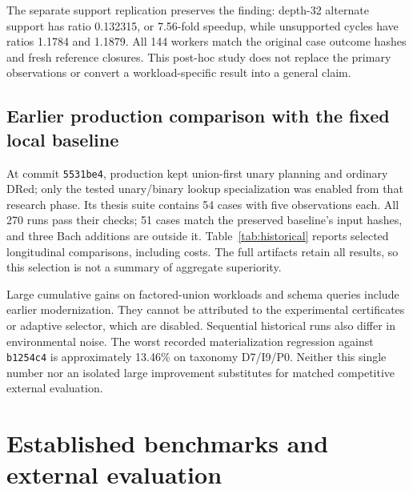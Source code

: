\documentclass{article}
\newcommand{\code}[1]{\texttt{#1}}
\begin{document}
The separate support replication preserves the finding: depth-32 alternate
support has ratio 0.132315, or 7.56-fold speedup, while unsupported cycles have
ratios 1.1784 and 1.1879. All 144 workers match the original case outcome hashes
and fresh reference closures. This post-hoc study does not replace the primary
observations or convert a workload-specific result into a general claim.


\subsection{Earlier production comparison with the fixed local baseline}
At commit \code{5531be4}, production kept union-first unary planning and ordinary
DRed; only the tested unary/binary lookup specialization was enabled from that
research phase. Its thesis suite contains 54 cases with five observations each. All 270
runs pass their checks; 51 cases match the preserved baseline's input hashes,
and three Bach additions are outside it. Table~\ref{tab:historical} reports
selected longitudinal comparisons, including costs. The full artifacts retain
all results, so this selection is not a summary of aggregate superiority.


Large cumulative gains on factored-union workloads and schema queries include earlier
modernization. They cannot be attributed to the experimental certificates or
adaptive selector, which are disabled. Sequential historical runs also differ
in environmental noise. The worst recorded materialization regression against
\code{b1254c4} is approximately 13.46\% on taxonomy D7/I9/P0. Neither this
single number nor an isolated large improvement substitutes for matched
competitive external evaluation.

\section{Established benchmarks and external evaluation}
\label{sec:external}













\end{document}
